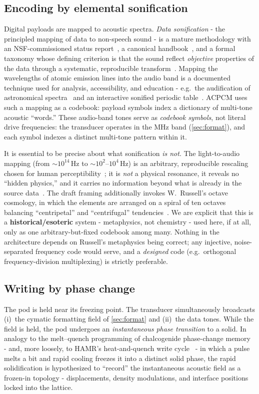 \documentclass[11pt]{article}
\theoremstyle{definition}
\begin{document}
\subsection{Encoding by elemental sonification}
Digital payloads are mapped to acoustic spectra. \emph{Data sonification} - the principled
mapping of data to non-speech sound - is a mature methodology with an NSF-commissioned
status report~\cite{kramer1999nsf}, a canonical handbook~\cite{hermann2011handbook}, and a
formal taxonomy whose defining criterion is that the sound reflect \emph{objective}
properties of the data through a systematic, reproducible
transform~\cite{hermann2008taxonomy}. Mapping the wavelengths of atomic emission lines into
the audio band is a documented technique used for analysis, accessibility, and
education - e.g.\ the audification of astronomical spectra~\cite{trayford2023spectra} and
an interactive sonified periodic table~\cite{smith2024periodic}. ACPCM uses such a mapping
as a codebook: payload symbols index a dictionary of multi-tone acoustic ``words.'' These
audio-band tones serve as \emph{codebook symbols}, not literal drive frequencies: the
transducer operates in the MHz band (\cref{sec:format}), and each symbol indexes a distinct
multi-tone pattern within it.

It is essential to be precise about what sonification \emph{is not}. The light-to-audio
mapping (from ${\sim}10^{14}$\,Hz to ${\sim}10^{2}$--$10^{4}$\,Hz) is an arbitrary,
reproducible rescaling chosen for human perceptibility~\cite{smith2024periodic}; it is
\emph{not} a physical resonance, it reveals no ``hidden physics,'' and it carries no
information beyond what is already in the source data~\cite{hermann2008taxonomy}. The draft
framing additionally invokes W.~Russell's octave cosmology, in which the elements are
arranged on a spiral of ten octaves balancing ``centripetal'' and ``centrifugal''
tendencies~\cite{russell1926universalone}. We are explicit that this is a
\textbf{historical/esoteric} system - metaphysics, not chemistry - used here, if at all,
only as one arbitrary-but-fixed codebook among many. Nothing in the architecture depends on
Russell's metaphysics being correct; any injective, noise-separated frequency code would
serve, and a \emph{designed} code (e.g.\ orthogonal frequency-division multiplexing) is
strictly preferable.

\subsection{Writing by phase change}
The pod is held near its freezing point. The transducer simultaneously broadcasts (i)~the
cymatic formatting field of \cref{sec:format} and (ii)~the data tones. While the field is
held, the pod undergoes an \emph{instantaneous phase transition} to a solid. In analogy to
the melt--quench programming of chalcogenide phase-change
memory~\cite{wuttig2007pcm,raoux2010pcm} - and, more loosely, to HAMR's heat-and-quench
write cycle~\cite{kryder2008hamr} - in which a pulse melts a bit and rapid cooling freezes
it into a distinct solid phase, the rapid solidification is hypothesized to ``record'' the
instantaneous acoustic field as a frozen-in topology - displacements, density modulations,
and interface positions locked into the lattice.
\end{document}
